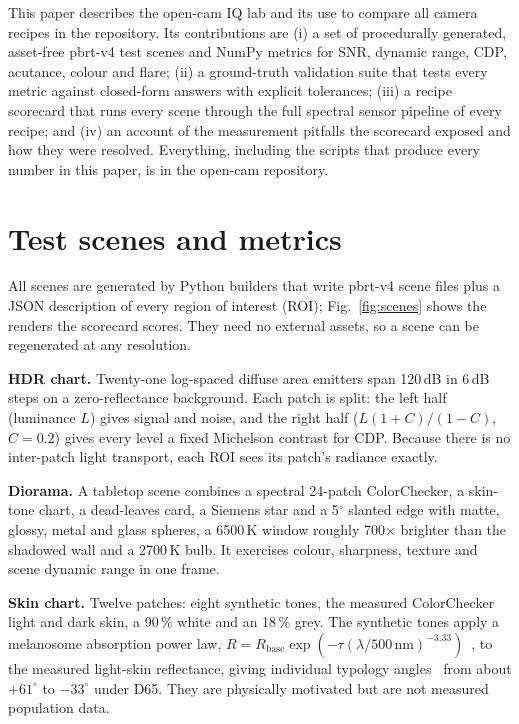 \documentclass[letterpaper,twocolumn,fleqn]{article}
\begin{document}
This paper describes the open-cam IQ lab and its use to compare all camera recipes in the repository. Its contributions are (i) a set of procedurally generated, asset-free pbrt-v4 test scenes and NumPy metrics for SNR, dynamic range, CDP, acutance, colour and flare; (ii) a ground-truth validation suite that tests every metric against closed-form answers with explicit tolerances; (iii) a recipe scorecard that runs every scene through the full spectral sensor pipeline of every recipe; and (iv) an account of the measurement pitfalls the scorecard exposed and how they were resolved. Everything, including the scripts that produce every number in this paper, is in the open-cam repository.

\section{Test scenes and metrics}
All scenes are generated by Python builders that write pbrt-v4 scene files plus a JSON description of every region of interest (ROI); Fig.~\ref{fig:scenes} shows the renders the scorecard scores. They need no external assets, so a scene can be regenerated at any resolution.

\textbf{HDR chart.} Twenty-one log-spaced diffuse area emitters span 120\,dB in 6\,dB steps on a zero-reflectance background. Each patch is split: the left half (luminance $L$) gives signal and noise, and the right half ($L(1+C)/(1-C)$, $C=0.2$) gives every level a fixed Michelson contrast for CDP. Because there is no inter-patch light transport, each ROI sees its patch's radiance exactly.

\textbf{Diorama.} A tabletop scene combines a spectral 24-patch ColorChecker, a skin-tone chart, a dead-leaves card, a Siemens star and a 5$^\circ$ slanted edge with matte, glossy, metal and glass spheres, a 6500\,K window roughly 700$\times$ brighter than the shadowed wall and a 2700\,K bulb. It exercises colour, sharpness, texture and scene dynamic range in one frame.

\textbf{Skin chart.} Twelve patches: eight synthetic tones, the measured ColorChecker light and dark skin, a 90\,\% white and an 18\,\% grey. The synthetic tones apply a melanosome absorption power law, $R = R_{\mathrm{base}}\exp(-\tau(\lambda/500\,\mathrm{nm})^{-3.33})$~\cite{jacques2013optical}, to the measured light-skin reflectance, giving individual typology angles~\cite{chardon1991ita} from about $+61^\circ$ to $-33^\circ$ under D65. They are physically motivated but are not measured population data.
\end{document}
